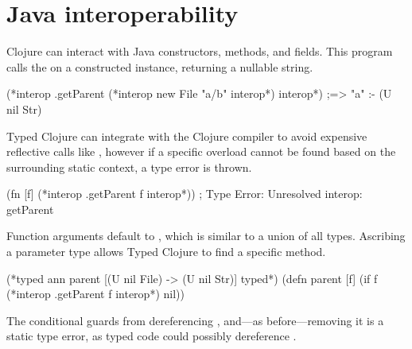 \section{Java interoperability}
\label{sec:overviewjavainterop}

Clojure can interact with Java constructors, methods, and fields.
This program calls the  on a constructed
instance, returning a nullable string.

\begin{exmp}
\begin{cljlisting}
(*interop .getParent (*interop new File "a/b" interop*) interop*)  ;=> "a" :- (U nil Str)
\end{cljlisting}
\label{example:getparent-direct-constructor}
\end{exmp}
%
Typed Clojure can integrate with the Clojure compiler to avoid expensive reflective 
calls like , however if a specific overload cannot be found based on the
surrounding static context, a type error is thrown.

\begin{cljlisting}
(fn [f] (*interop .getParent f interop*)) ; Type Error: Unresolved interop: getParent
\end{cljlisting}

Function arguments default to , which is similar to a union of all types. Ascribing
a parameter type allows Typed Clojure to find a specific method.


\begin{exmp}
\begin{cljlisting}
(*typed ann parent [(U nil File) -> (U nil Str)] typed*)
(defn parent [f] (if f (*interop .getParent f interop*) nil))
\end{cljlisting}
\label{example:parent-if}
\end{exmp}


The conditional guards from dereferencing , and---as before---removing 
it is a static type error, as typed code could possibly dereference .

